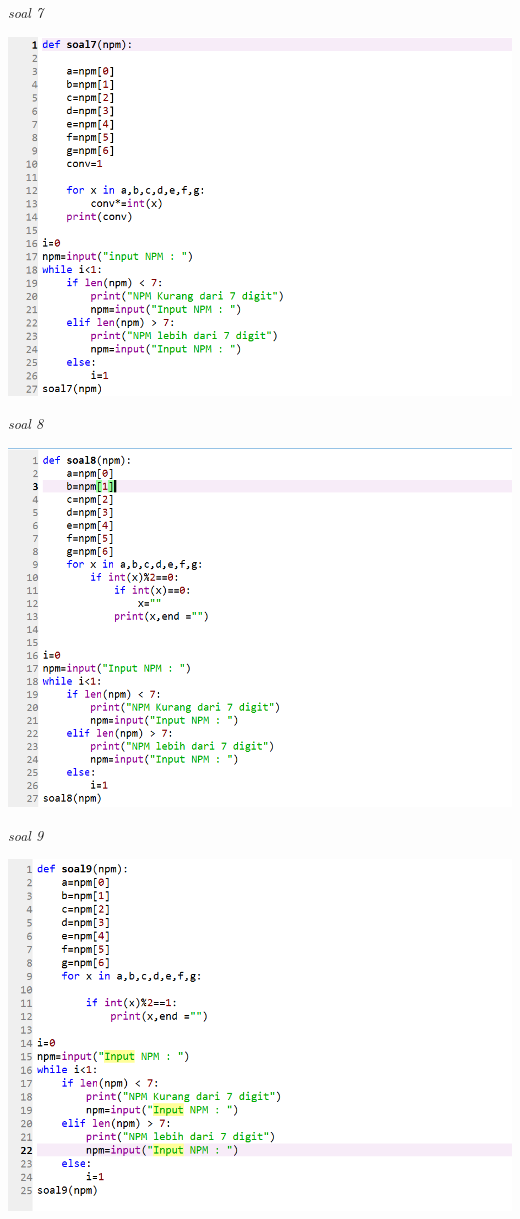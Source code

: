 \documentclass{article}
\begin{document}
\textit{soal 7}
\begin{center}
    \includegraphics[width=15cm\textwidth]{figure/7.png}
\end{center}

\textit{soal 8}
\begin{center}
    \includegraphics[width=15cm\textwidth]{figure/8.png}
\end{center}

\textit{soal 9}
\begin{center}
    \includegraphics[width=15cm\textwidth]{figure/9.png}
\end{center}
\end{document}
